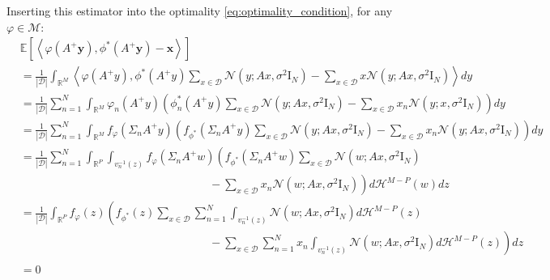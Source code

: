 \documentclass[a4paper,10pt]{article}
\theoremstyle{definition} %
\theoremstyle{definition} %
\theoremstyle{definition} %
\theoremstyle{definition} %
\newcommand{\R}{\mathbb{R}}
\newcommand{\E}[1]{\mathbb{E} \left[ {#1} \right] }
\newcommand{\Normal}[1]{\mathcal{N}\left( {#1} \right)}
\newcommand{\Id}{\mathrm{I}}
\newcommand{\inner}[1]{\left\langle #1 \right\rangle}
\newcommand{\M}{\mathcal{M}}
\newcommand{\x}{\boldsymbol{x}}
\newcommand{\y}{\boldsymbol{y}}
\newcommand{\0}{\boldsymbol{0}}
\renewcommand{\H}{\mathcal{H}}
\newcommand{\D}{\mathcal{D}}
\renewcommand{\det}[1]{\mathrm{det}\left( #1 \right)}
\begin{document}
Inserting this estimator into the optimality \cref{eq:optimality_condition}, for any $\varphi \in \M$:
\begin{align*}
    &\E{\inner{\varphi(A^+ \y), \phi^*(A^+  \y) - \x}}  \\
    &=  \frac{1}{|\D|} \int_{\R^M} \inner{\varphi(A^+  y), \phi^*(A^+  y) \sum_{x \in \D} \Normal{y; A x, \sigma^2 \Id_N} - \sum_{x \in \D} x \Normal{y; A x, \sigma^2 \Id_N}} dy \\
    &=  \frac{1}{|\D|} \sum_{n = 1}^{N} \int_{\R^M} \varphi_n (A^+  y) \left( \phi^*_n(A^+  y) \sum_{x \in \D} \Normal{y; A x, \sigma^2 \Id_N} - \sum_{x \in \D} x_n \Normal{y; x, \sigma^2 \Id_N} \right) dy \\
    &=  \frac{1}{|\D|} \sum_{n = 1}^{N} \int_{\R^M} f_{\varphi} (\Sigma_n A^+  y) \left( f_{\phi^*}(\Sigma_n A^+  y) \sum_{x \in \D} \Normal{y; A x, \sigma^2 \Id_N} - \sum_{x \in \D} x_n \Normal{y; A x, \sigma^2 \Id_N} \right) dy \\
    &=  \frac{1}{|\D|} \sum_{n = 1}^{N} \int_{\R^P} \int_{v_n^{-1}(z)} f_{\varphi} (\Sigma_n A^+ w) \left( f_{\phi^*}(\Sigma_n A^+ w) \sum_{x \in \D} \Normal{w; A x, \sigma^2 \Id_N} \right. 
    \\& \left. \hspace{7cm} -\sum_{x \in \D} x_n \Normal{w; A x, \sigma^2 \Id_N} \right) d\H^{M - P}(w) dz \\
    &=  \frac{1}{|\D|}  \int_{\R^P} f_{\varphi}(z) \left(  f_{\phi^*}(z) \sum_{x \in \D} \sum_{n = 1}^{N} \int_{v_n^{-1}(z)} \Normal{w; A x, \sigma^2 \Id_N} d\H^{M-P}(z) \right. 
    \\& \left. \hspace{7cm} - \sum_{x \in \D} \sum_{n = 1}^{N} x_n \int_{v_n^{-1}(z)} \Normal{w; A x, \sigma^2 \Id_N} d\H^{M-P}(z)\right) dz \\
    \\&= 0 
\end{align*}
\end{document}
